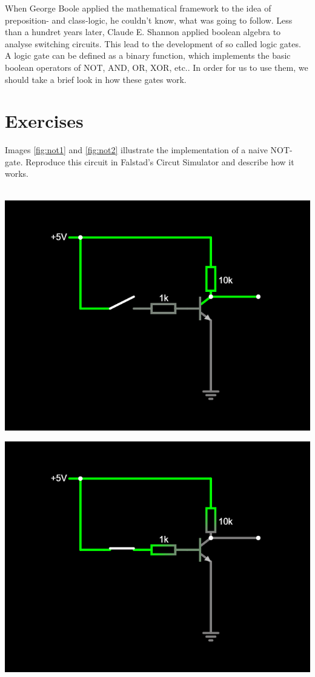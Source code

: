 \documentclass{dcbl/challenge}
\begin{document}
When George Boole applied the mathematical framework to the idea of preposition- and class-logic, he couldn't know, what was going to follow. 
Less than a hundret years later, Claude E. Shannon applied boolean algebra to analyse switching circuits.
This lead to the development of so called logic gates. 
A logic gate can be defined as a binary function, which implements the basic boolean operators of NOT, AND, OR, XOR, etc.. 
In order for us to use them, we should take a brief look in how these gates work. 

\section*{Exercises}
\begin{aufgabe}
    Images \ref{fig:not1} and \ref{fig:not2} illustrate the implementation of a naive NOT-gate.
    Reproduce this circuit in Falstad's Circut Simulator and describe how it works.\\\\
    \vspace{1cm}
    \noindent 
    \begin{minipage}{.5\textwidth} 
    \centering
    \includegraphics[width=.9\linewidth]{not1.png} 
    \label{fig:not1}
    \end{minipage}
    \begin{minipage}{.5\textwidth}
    \centering
    \includegraphics[width=.9\linewidth]{not2.png}

\end{minipage}
\end{aufgabe}
\end{document}
